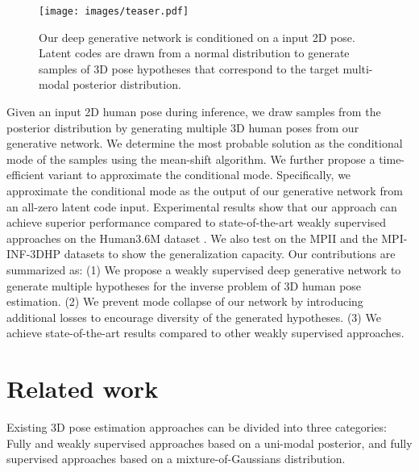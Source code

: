 \documentclass{bmvc2k}
\begin{document}
\begin{SCfigure}
  \texttt{[image: images/teaser.pdf]}
    \label{fig:teaser}
      \caption{Our deep generative network is conditioned on a input 2D pose. Latent codes are drawn from a normal distribution to generate samples of 3D pose hypotheses that correspond to the target multi-modal posterior distribution.}
  \vspace{-3mm}
\end{SCfigure}

Given an input 2D human pose during inference, we draw samples from the posterior distribution by generating multiple 3D human poses from our generative network. We determine the most probable solution as the conditional mode of the samples using the mean-shift algorithm. We further propose a time-efficient variant to approximate the conditional mode. Specifically, we approximate the conditional mode as the output of our generative network from an all-zero latent code input.
Experimental results show that our approach can achieve superior performance compared to state-of-the-art weakly supervised approaches on the Human3.6M dataset \cite{ionescu2013human3}. We also test on the MPII \cite{andriluka20142d} and the MPI-INF-3DHP datasets \cite{mehta2017monocular} to show the generalization capacity. Our contributions are summarized as:
(1) We propose a weakly supervised deep generative network to generate multiple hypotheses for the inverse problem of 3D human pose estimation. 
(2) We prevent mode collapse of our network by introducing additional losses to encourage diversity of the generated hypotheses.
(3) We achieve state-of-the-art results compared to other weakly supervised approaches.
\vspace{-2mm}

\section{Related work}
Existing 3D pose estimation approaches can be divided into three categories: Fully and weakly supervised approaches based on a uni-modal posterior, and fully supervised approaches based on a mixture-of-Gaussians distribution. 
\end{document}
